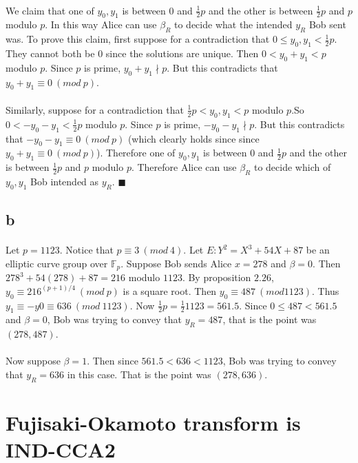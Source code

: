 \documentclass[letterpaper,12pt,oneside,onecolumn]{report}
\begin{document}
\paragraph{}
We claim that one of $y_0,y_1$ is between $0$ and $\frac{1}{2}p$ and the other is between $\frac{1}{2}p$ and $p$ modulo $p$. In this way Alice can use $\beta_R$ to decide what the intended $y_R$ Bob sent was. To prove this claim, first suppose for a contradiction that $0 \leq y_0,y_1 < \frac{1}{2}p$. They cannot both be $0$ since the solutions are unique. Then $0 < y_0 + y_1 < p$ modulo $p$. Since $p$ is prime, $y_0 + y_1 \nmid p$. But this contradicts that $y_0 + y_1 \equiv 0\ (mod\ p)$.
\paragraph{}
Similarly, suppose for a contradiction that $\frac{1}{2}p < y_0,y_1 < p$ modulo $p$.So  $0 < -y_0 -y_1 < \frac{1}{2}p$ modulo $p$. Since $p$ is prime, $-y_0 - y_1 \nmid p$. But this contradicts that $-y_0 -y_1 \equiv 0\ (mod\ p)$ (which clearly holds since since $y_0 + y_1 \equiv 0\ (mod\ p)$). Therefore one of $y_0,y_1$ is between $0$ and $\frac{1}{2}p$ and the other is between $\frac{1}{2}p$ and $p$ modulo $p$. Therefore Alice can use $\beta_R$ to decide which of $y_0,y_1$ Bob intended as $y_R$. $\blacksquare$
\subsection*{b}
\paragraph{}
Let $p = 1123$. Notice that $p \equiv 3\ (mod\ 4)$. Let $E: Y^2 = X^3 + 54X + 87$ be an elliptic curve group over $\mathbb{F}_p$. Suppose Bob sends Alice $x=278$ and $\beta = 0$. Then $278^3 + 54(278) + 87 = 216$ modulo $1123$. By proposition $2.26$, $y_0 \equiv 216^{(p+1)/4}\ (mod\ p)$ is a square root. Then $y_0 \equiv 487\ (mod 1123)$. Thus $y_1 \equiv -y0 \equiv 636\ (mod\ 1123)$. Now $\frac{1}{2}p = \frac{1}{2}1123 = 561.5$. Since $0 \leq 487 < 561.5$ and $\beta = 0$, Bob was trying to convey that $y_R = 487$, that is the point was $(278, 487)$.
\paragraph{}
Now suppose $\beta = 1$. Then since $561.5 < 636 < 1123$, Bob was trying to convey that $y_R = 636$ in this case. That is the point was $(278, 636)$.
\section*{Fujisaki-Okamoto transform is IND-CCA2}
\end{document}

